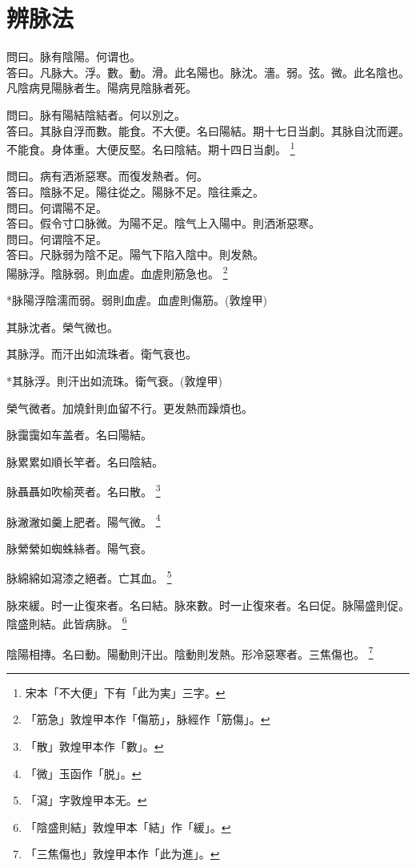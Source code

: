 \chapter{辨脉法}

問曰。脉有陰陽。何谓也。\\
答曰。凡脉大。浮。數。動。滑。此名陽也。脉沈。濇。弱。弦。微。此名陰也。凡陰病見陽脉者生。陽病見陰脉者死。

問曰。脉有陽結陰結者。何以別之。\\
答曰。其脉{\khaaitp 自}浮而數。能食。不大便。名曰陽結。期十七日当劇。其脉{\khaaitp 自}沈而遲。不能食。身体重。大便反堅。名曰陰結。期十四日当劇。
	\footnote{宋本「不大便」下有「此为実」三字。}

問曰。病有洒淅惡寒。而復发熱者。何。\\
答曰。陰脉不足。陽往從之。陽脉不足。陰往乘之。\\
問曰。何谓陽不足。\\
答曰。假令寸口脉微。为陽不足。陰气上入陽中。則洒淅惡寒。\\
問曰。何谓陰不足。\\
答曰。尺脉弱为陰不足。陽气下陷入陰中。則发熱。\\

陽脉浮。陰脉弱。則血虗。血虗則筋急也。
	\footnote{「筋急」敦煌甲本作「傷筋」，脉經作「筋傷」。}

*脉陽浮陰濡而弱。弱則血虗。血虗則傷筋。(敦煌甲)

其脉沈者。榮气微也。

其脉浮。而汗出如流珠者。衛气衰也。

*其脉浮。則汗出如流珠。衛气衰。(敦煌甲)

榮气微者。加燒針則血留不行。更发熱而躁煩也。

脉靄靄如车盖者。名曰陽結。

脉累累如順长竿者。名曰陰結。

脉聶聶如吹榆莢者。名曰散。
	\footnote{「散」敦煌甲本作「數」。}

脉潎潎如羹上肥者。陽气微。
	\footnote{「微」玉函作「脱」。}

脉縈縈如蜘蛛絲者。陽气衰。

脉綿綿如{\khaaitp 瀉}漆之絕者。亡其血。
	\footnote{「瀉」字敦煌甲本无。}

脉來緩。时一止復來者。名曰結。脉來數。时一止復來者。名曰促。脉陽盛則促。陰盛則結。此皆病脉。
	\footnote{「陰盛則結」敦煌甲本「結」作「緩」。}

陰陽相摶。名曰動。陽動則汗出。陰動則发熱。形冷惡寒者。三焦傷也。
	\footnote{「三焦傷也」敦煌甲本作「此为進」。}

